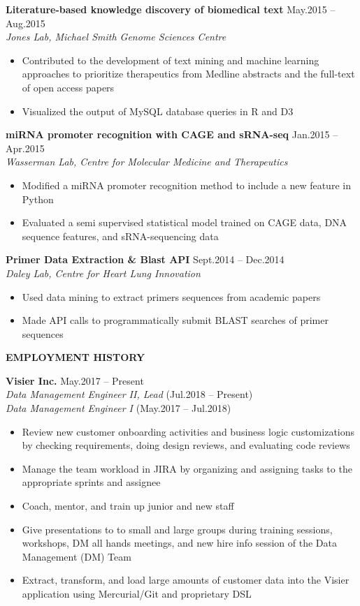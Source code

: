 \documentclass{res}
\renewcommand{\section}[1]{%
  \vspace{0.3in}%
  \centerline{\uppercase{\bf{#1}}}%
  \vspace{-6pt}}
\newcommand{\linehead}[2]{%
  {\bf #1} \hfill #2\\}
\newcommand{\linetitle}[1]{%
  {\sl #1}}
\begin{document}
\begin{resume}
\linehead{Literature-based knowledge discovery of biomedical text}{May.2015 -- Aug.2015}
\linetitle{Jones Lab, Michael Smith Genome Sciences Centre}
\begin{itemize}
  \item Contributed to the development of text mining and machine learning approaches to prioritize therapeutics from Medline abstracts and the full-text of open access papers
  \item Visualized the output of MySQL database queries in R and D3
\end{itemize}

\linehead{miRNA promoter recognition with CAGE and sRNA-seq}{Jan.2015 -- Apr.2015}
\linetitle{Wasserman Lab, Centre for Molecular Medicine and Therapeutics}
\begin{itemize}
  \item Modified a miRNA promoter recognition method to include a new feature in Python
  \item Evaluated a semi supervised statistical model trained on CAGE data, DNA sequence features, and sRNA-sequencing data
\end{itemize}

\linehead{Primer Data Extraction \& Blast API}{Sept.2014 -- Dec.2014}
\linetitle{Daley Lab, Centre for Heart Lung Innovation}
\begin{itemize}
  \item Used data mining to extract primers sequences from academic papers
  \item Made API calls to programmatically submit BLAST searches of primer sequences
\end{itemize}

\section{Employment history}

\linehead{Visier Inc.}{May.2017 -- Present}
\linetitle{Data Management Engineer II, Lead}{ (Jul.2018 -- Present)}\\
\linetitle{Data Management Engineer I}{ (May.2017 -- Jul.2018)}
\begin{itemize}
  \item Review new customer onboarding activities and business logic customizations by checking requirements, doing design reviews, and evaluating code reviews
  \item Manage the team workload in JIRA by organizing and assigning tasks to the appropriate sprints and assignee
  \item Coach, mentor, and train up junior and new staff
  \item Give presentations to to small and large groups during training sessions, workshops, DM all hands meetings, and new hire info session of the Data Management (DM) Team
  \item Extract, transform, and load large amounts of customer data into the Visier application using Mercurial/Git and proprietary DSL
\end{itemize}


\end{resume}
\end{document}
